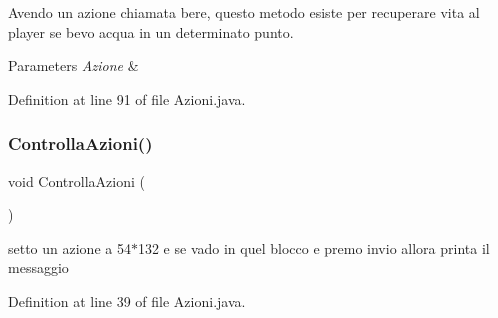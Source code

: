 Avendo un azione chiamata bere, questo metodo esiste per recuperare vita al player se bevo acqua in un determinato punto. 


\begin{DoxyParams}{Parameters}
{\em Azione} & \\
\hline
\end{DoxyParams}


Definition at line 91 of file Azioni.\+java.

\mbox{\label{classa_1_1survival_1_1game_1_1_azioni_a39753d0160b9846cd1dd3d4556519456}} 
\subsubsection{\texorpdfstring{Controlla\+Azioni()}{ControllaAzioni()}}
{\footnotesize\ttfamily void Controlla\+Azioni (\begin{DoxyParamCaption}{ }\end{DoxyParamCaption})}



setto un azione a 54$\ast$132 e se vado in quel blocco e premo invio allora printa il messaggio 



Definition at line 39 of file Azioni.\+java.

